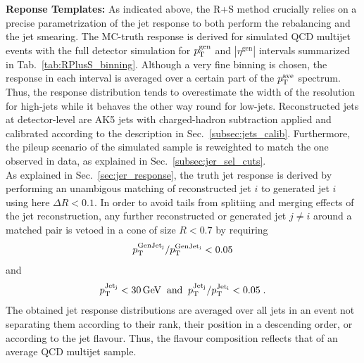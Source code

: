 \begin{description}
 \item \textbf{Reponse Templates:}
As indicated above, the R+S method crucially relies on a precise parametrization of the jet response to both perform the rebalancing and the jet smearing. The MC-truth response is derived for simulated QCD multijet events with the full detector simulation for $\pt^\mathrm{gen}$ and $|\eta^\mathrm{gen}|$ intervals summarized in Tab.~\ref{tab:RPlusS_binning}. Although a very fine binning is chosen, the response in each interval is averaged over a certain part of the $p_{\text{T}}^\mathrm{ave}$ spectrum. Thus, the response distribution tends to overestimate the width of the resolution for high-\pt jets while it behaves the other way round for low-\pt jets. Reconstructed jets at detector-level are AK5 jets with charged-hadron subtraction applied and calibrated according to the description in Sec.~\ref{subsec:jets_calib}. Furthermore, the pileup scenario of the simulated sample is reweighted to match the one observed in data, as explained in Sec.~\ref{subsec:jer_sel_cuts}. \\
As explained in Sec.~\ref{sec:jer_response}, the truth jet response is derived by performing an unambigous matching of reconstructed jet $i$ to generated jet $i$ using here $\Delta R < 0.1$. In order to avoid tails from splitiing and merging effects of the jet reconstruction, any further reconstructed or generated jet $j \ne i$ around a matched pair is vetoed in a cone of size $R < 0.7$ by requiring
\begin{equation}
 p_{\text{T}}^{\rm{GenJet}_j} / p_{\text{T}}^{\rm{GenJet}_i} < 0.05
\end{equation} 
and
\begin{equation}
 p_{\text{T}}^{\rm{Jet}_j} < 30\,\mathrm{GeV} \;\; \mathrm{and} \;\; p_{\text{T}}^{\rm{Jet}_j} / p_{\text{T}}^{\rm{Jet}_i} < 0.05 \; .
\end{equation} 
The obtained jet response distributions are averaged over all jets in an event not separating them according to their rank, \ie their position in a descending \pt order, or according to the jet flavour. Thus, the flavour composition reflects that of an average QCD multijet sample. 
\begin{table}[!t]
\centering
\caption{Overview of the $|\eta^\mathrm{gen}|$ and $\pt^\mathrm{gen}$ interval boundaries used for the MC-truth response determination used as input for the R+S method.}
\label{tab:RPlusS_binning}
\end{table}
\end{description}
